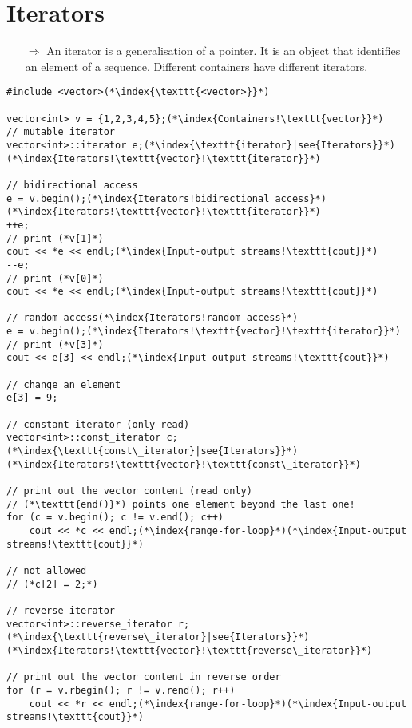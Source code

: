 \documentclass[10pt]{article}
\begin{document}
\section{Iterators}
\small
\begin{enumerate}
\item[$\Rightarrow$] An iterator is a generalisation of a pointer. It is an object that identifies an element of a sequence. Different containers have
different iterators.
\end{enumerate}
\begin{lstlisting}
#include <vector>(*\index{\texttt{<vector>}}*)

vector<int> v = {1,2,3,4,5};(*\index{Containers!\texttt{vector}}*)
// mutable iterator
vector<int>::iterator e;(*\index{\texttt{iterator}|see{Iterators}}*)(*\index{Iterators!\texttt{vector}!\texttt{iterator}}*)

// bidirectional access
e = v.begin();(*\index{Iterators!bidirectional access}*)(*\index{Iterators!\texttt{vector}!\texttt{iterator}}*)
++e;
// print (*v[1]*)
cout << *e << endl;(*\index{Input-output streams!\texttt{cout}}*)
--e;
// print (*v[0]*)
cout << *e << endl;(*\index{Input-output streams!\texttt{cout}}*)

// random access(*\index{Iterators!random access}*)
e = v.begin();(*\index{Iterators!\texttt{vector}!\texttt{iterator}}*)
// print (*v[3]*)
cout << e[3] << endl;(*\index{Input-output streams!\texttt{cout}}*)

// change an element
e[3] = 9;

// constant iterator (only read)
vector<int>::const_iterator c;(*\index{\texttt{const\_iterator}|see{Iterators}}*)(*\index{Iterators!\texttt{vector}!\texttt{const\_iterator}}*)

// print out the vector content (read only)
// (*\texttt{end()}*) points one element beyond the last one!
for (c = v.begin(); c != v.end(); c++)
    cout << *c << endl;(*\index{range-for-loop}*)(*\index{Input-output streams!\texttt{cout}}*)

// not allowed
// (*c[2] = 2;*)

// reverse iterator
vector<int>::reverse_iterator r;(*\index{\texttt{reverse\_iterator}|see{Iterators}}*)(*\index{Iterators!\texttt{vector}!\texttt{reverse\_iterator}}*)

// print out the vector content in reverse order
for (r = v.rbegin(); r != v.rend(); r++)
    cout << *r << endl;(*\index{range-for-loop}*)(*\index{Input-output streams!\texttt{cout}}*)
\end{lstlisting}
\end{document}
